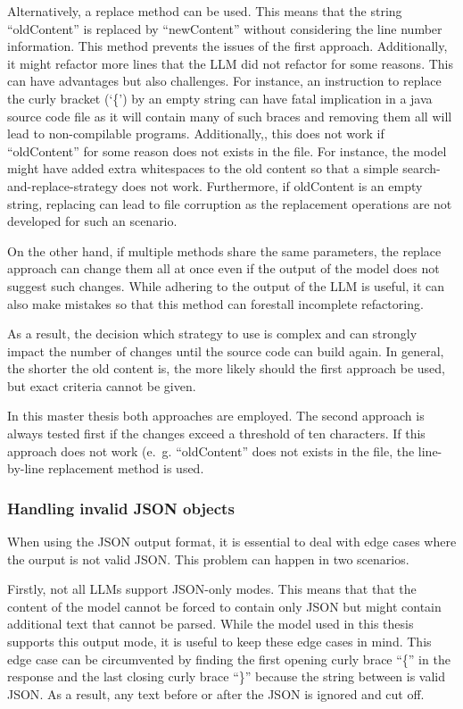 Alternatively, a replace method can be used. This means that the string \enquote{oldContent} is replaced by \enquote{newContent} without considering the line number information. This method prevents the issues of the first approach. Additionally, it might refactor more lines that the \ac{LLM} did not refactor for some reasons. This can have advantages but also challenges. For instance, an instruction to replace the curly bracket (\enquote*{\{}) by an empty string can have fatal implication in a java source code file as it will contain many of such braces and removing them all will lead to non-compilable programs. Additionally,, this does not work if \enquote{oldContent} for some reason does not exists in the file. For instance, the model might have added extra whitespaces to the old content so that a simple search-and-replace-strategy does not work. Furthermore, if oldContent is an empty string, replacing can lead to file corruption as the replacement operations are not developed for such an scenario. 

On the other hand, if multiple methods share the same parameters, the replace approach can change them all at once even if the output of the model does not suggest such changes. While adhering to the output of the \ac{LLM} is useful, it can also make mistakes so that this method can forestall incomplete refactoring. 

As a result, the decision which strategy to use is complex and can strongly impact the number of changes until the source code can build again. In general, the shorter the old content is, the more likely should the first approach be used, but exact criteria cannot be given. 


In this master thesis both approaches are employed. The second approach is always tested first if the changes exceed a threshold of ten characters. If this approach does not work (e.~g. \enquote{oldContent} does not exists in the file, the line-by-line replacement method is used.  

\subsubsection{Handling invalid \ac{JSON} objects}

When using the \ac{JSON} output format, it is essential to deal with edge cases where the ourput is not valid \ac{JSON}. This problem can happen in two scenarios.

Firstly, not all \acp{LLM} support \ac{JSON}-only modes. This means that that the content of the model cannot be forced to contain only \ac{JSON} but might contain additional text that cannot be parsed. While the model used in this thesis supports this output mode, it is useful to keep these edge cases in mind. This edge case can be circumvented by finding the first opening curly brace \enquote{\{} in the response and the last closing curly brace \enquote{\}} because the string between is valid \ac{JSON}. As a result, any text before or after the \ac{JSON} is ignored and cut off. 


